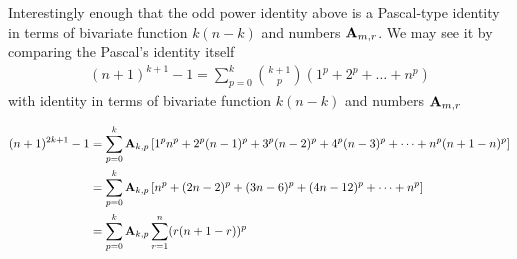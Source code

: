 Interestingly enough that the odd power identity above is a Pascal-type identity
in terms of bivariate function $k(n-k)$ and numbers ${\mathbf{A}} \sb{m,r}$.
We may see it by comparing the Pascal's identity itself~\cite{macmillan2011proofs}
\begin{align*}
(n+1)
    ^{k+1}-1=\sum _{p=0}^{k}{\binom {k+1}{p}}(1^{p}+2^{p}+\dots +n^{p})
\end{align*}
with identity in terms of bivariate function $k(n-k)$ and numbers ${\mathbf{A}} \sb{m,r}$
\begin{proposition}
    \begin{align*}
    (n+1)
        ^{2k+1} - 1
        &= \sum_{p=0}^{k} {\mathbf{A}} \sb{k,p} \left[ 1^p n^p + 2^p (n-1)^p + 3^p (n-2)^p + 4^p (n-3)^p + \cdots +  n^p (n+1-n)^p  \right] \\
        &= \sum_{p=0}^{k} {\mathbf{A}} \sb{k,p} \left[ n^p + (2n-2)^p + (3n-6)^p + (4n-12)^p + \cdots +  n^p  \right] \\
        &= \sum_{p=0}^{k} {\mathbf{A}} \sb{k,p} \sum_{r=1}^{n} (r (n+1-r))^p
    \end{align*}
\end{proposition}
